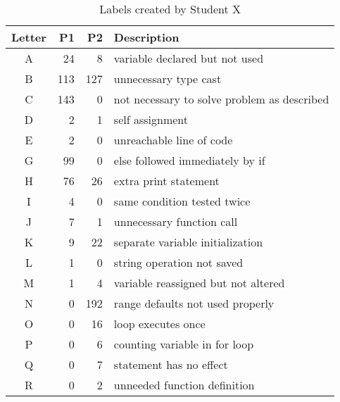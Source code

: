 \begin{table}
\begin{tabular}{crrp{}}

Letter & P1 & P2 & Description \\ 
\toprule
A & 24 & 8 & variable declared but not used \\
B & 113 & 127 & unnecessary type cast \\
C & 143 & 0 & not necessary to solve problem as described \\
D & 2 & 1 & self assignment \\
E & 2 & 0 & unreachable line of code \\
G & 99 & 0 & else followed immediately by if \\
H & 76 & 26 & extra print statement \\
I & 4 & 0 & same condition tested twice \\
J & 7 & 1 & unnecessary function call \\
K & 9 & 22 & separate variable initialization \\
L & 1 & 0 & string operation not saved \\
M & 1 & 4 & variable reassigned but not altered \\
N & 0 & 192 & range defaults not used properly \\
O & 0 & 16 & loop executes once \\
P & 0 & 6 & counting variable in for loop \\
Q & 0 & 7 & statement has no effect \\
R & 0 & 2 & unneeded function definition \\
\end{tabular}
\caption{Labels created by Student X}
\end{table}
